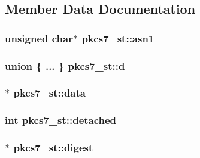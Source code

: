 \subsection{Member Data Documentation}
\subsubsection[{\texorpdfstring{asn1}{asn1}}]{\setlength{\rightskip}{0pt plus 5cm}unsigned char$\ast$ pkcs7\+\_\+st\+::asn1}\hypertarget{structpkcs7__st_ab1fc765421d37e4483b30cf1f12123d5}{}\label{structpkcs7__st_ab1fc765421d37e4483b30cf1f12123d5}
\subsubsection[{\texorpdfstring{d}{d}}]{\setlength{\rightskip}{0pt plus 5cm}union \{ ... \}   pkcs7\+\_\+st\+::d}\hypertarget{structpkcs7__st_a0d40ba1a66dac4d1f19da42dec6adfd3}{}\label{structpkcs7__st_a0d40ba1a66dac4d1f19da42dec6adfd3}
\subsubsection[{\texorpdfstring{data}{data}}]{$\ast$ pkcs7\+\_\+st\+::data}\hypertarget{structpkcs7__st_aa85034648deabb1e0f6edeaa2d75ee50}{}\label{structpkcs7__st_aa85034648deabb1e0f6edeaa2d75ee50}
\subsubsection[{\texorpdfstring{detached}{detached}}]{\setlength{\rightskip}{0pt plus 5cm}int pkcs7\+\_\+st\+::detached}\hypertarget{structpkcs7__st_aaefed5b8e3dc5995f7fb1e1a300b7668}{}\label{structpkcs7__st_aaefed5b8e3dc5995f7fb1e1a300b7668}
\subsubsection[{\texorpdfstring{digest}{digest}}]{$\ast$ pkcs7\+\_\+st\+::digest}\hypertarget{structpkcs7__st_a1c5d480705bdf17b4632d8ef2031a46d}{}\label{structpkcs7__st_a1c5d480705bdf17b4632d8ef2031a46d}
